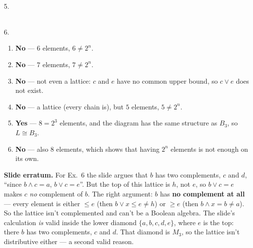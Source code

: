 \documentclass{fkt-notes}
\newcommand{\erratum}[1]{\par\noindent\textbf{Slide erratum.} #1\par}
\theoremstyle{definition}
\begin{document}
\begin{minipage}[b]{0.2\textwidth}\centering
  \\ \small 5.
\end{minipage}%
\begin{minipage}[b]{0.18\textwidth}\centering
  \\ \small 6.
\end{minipage}

\medskip
\begin{enumerate}[label=\arabic*.,nosep]
  \item \textbf{No} --- $6$ elements, $6\ne2^n$.
  \item \textbf{No} --- $7$ elements, $7\ne2^n$.
  \item \textbf{No} --- not even a lattice: $c$ and $e$ have no common
        upper bound, so $c\vee e$ does not exist.
  \item \textbf{No} --- a lattice (every chain is), but $5$ elements,
        $5\ne2^n$.
  \item \textbf{Yes} --- $8=2^3$ elements, and the diagram has the same
        structure as $B_3$, so $L\cong B_3$.
  \item \textbf{No} --- also $8$ elements, which shows that having $2^n$
        elements is not enough on its own.
\end{enumerate}
\erratum{For Ex.~6 the slide argues that $b$ has two complements,
  $c$ and $d$, ``since $b\wedge c=a$, $b\vee c=e$''. But the top of this
  lattice is $h$, not $e$, so $b\vee c=e$ makes $c$ \emph{no} complement
  of $b$. The right argument: $b$ has \textbf{no complement at all} ---
  every element is either $\le e$ (then $b\vee x\le e\ne h$) or $\ge e$
  (then $b\wedge x=b\ne a$). So the lattice isn't complemented and can't be
  a Boolean algebra. The slide's calculation \emph{is} valid inside the
  lower diamond $\{a,b,c,d,e\}$, where $e$ is the top: there $b$ has two
  complements, $c$ and $d$. That diamond is $M_3$, so the lattice isn't
  distributive either --- a second valid reason.}
\end{document}
